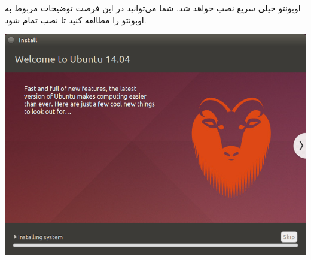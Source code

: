 اوبونتو خیلی سریع نصب خواهد شد. شما می‌توانید در این فرصت توضیحات مربوط به اوبونتو را مطالعه کنید تا نصب تمام شود.
\begin{center}
\includegraphics[scale=0.52]{pics/12.png}
\end{center}
